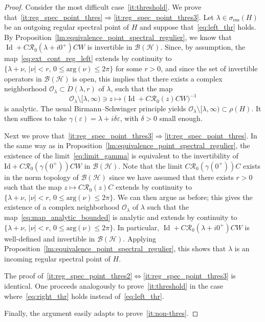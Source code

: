 \documentclass[10pt]{amsart}
\theoremstyle{definition}\newtheorem{defi}[theo]{Definition}\newtheorem{rema}[theo]{Remark}\newtheorem{exam}[theo]{Example}\newtheorem{exem}[theo]{Example}\newtheorem{nota}[theo]{Notation}
\newcommand{\Hi}{\mathcal{H}}
\newcommand{\ess}{\mathrm{ess}}
\newcommand{\Res}{\mathcal{R}}
\newcommand{\clB}{\mathcal{B}}
\DeclareMathOperator{\Id}{Id}
\begin{document}
\begin{proof}
Consider the most difficult case~\eqref{it:threshold}. We prove that~\eqref{it:reg_spec_point_thres}$\Rightarrow$\eqref{it:reg_spec_point_thres3}. Let $\lambda\in\sigma_{\ess}(H)$ be an outgoing regular spectral point of $H$ and suppose that~\eqref{eq:left_thr} holds. By Proposition~\ref{lm:equivalence_point_spectral_regulier}, we know that $\Id+C\Res_0(\lambda+ i0^+)CW$ is invertible in $\clB(\Hi)$. Since, by assumption, the map~\eqref{eq:ext_cont_reg_left} extends by continuity to $\{\lambda+\nu, \, |\nu|<r, \, 0\le\mathrm{arg}(\nu)\le2\pi\}$ for some $r>0$, and since the set of invertible operators in $\clB(\Hi)$ is open, this implies that there exists a complex neighborhood $\mathcal{O}_\lambda\subset \mathring{D}(\lambda,r)$ of $\lambda$, such that the map
\begin{equation}\label{eq:map_analytic_bounded}
\mathcal{O}_\lambda\setminus[\lambda,\infty)\ni z\mapsto \big(\Id+C\Res_0(z)CW\big)^{-1}
\end{equation}
is analytic. The usual Birmann--Schwinger principle yields $\mathcal{O}_\lambda\setminus[\lambda,\infty)\subset\rho(H)$. It then suffices to take $\gamma(\varepsilon)=\lambda+i\delta\varepsilon$, with $\delta>0$ small enough.

Next we prove that~\eqref{it:reg_spec_point_thres3}$\Rightarrow$\eqref{it:reg_spec_point_thres}. In the same way as in Proposition~\ref{lm:equivalence_point_spectral_regulier}, the existence of the limit~\eqref{eq:limit_gamma} is equivalent to the invertibility of $\mathrm{Id}+C\Res_0(\gamma(0^+))CW$ in $\clB(\Hi)$. Note that the limit $C\Res_0(\gamma(0^+))C$ exists in the norm topology of $\clB(\Hi)$ since we have assumed that there exists $r>0$ such that the map $z\mapsto C\Res_0(z)C$ extends by continuity to $\{\lambda+\nu, \, |\nu|<r, \, 0\le\mathrm{arg}(\nu)\le2\pi\}$. We can then argue as before; this gives the existence of a complex neighborhood $\mathcal{O}_\lambda$ of $\lambda$ such that the map~\eqref{eq:map_analytic_bounded} is analytic and extends by continuity to $\{\lambda+\nu, \, |\nu|<r, \, 0\le\mathrm{arg}(\nu)\le2\pi\}$. In particular, $\Id+C\Res_0(\lambda+ i0^+)CW$ is well-defined and invertible in $\clB(\Hi)$. Applying Proposition~\ref{lm:equivalence_point_spectral_regulier}, this shows that $\lambda$ is an incoming regular spectral point of $H$.

The proof of~\eqref{it:reg_spec_point_thres2}$\Leftrightarrow$\eqref{it:reg_spec_point_thres3} is identical. One proceeds analogously to prove~\eqref{it:threshold} in the case where~\eqref{eq:right_thr} holds instead of~\eqref{eq:left_thr}.

Finally, the argument easily adapts to prove~\eqref{it:non-thres}.
\end{proof}
\end{document}
